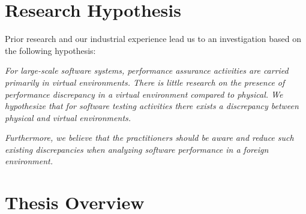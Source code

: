 
\section{Research Hypothesis}
Prior research and our industrial experience lead us to an investigation based on the following hypothesis:
	
\begin{framed}
		\textit{For large-scale software systems, performance assurance activities are carried primarily in virtual environments. There is little research on the presence of performance discrepancy in a virtual environment compared to physical. We hypothesize that for software testing activities there exists a discrepancy between physical and virtual environments.} %
		\par 	
		\textit{Furthermore, we believe that the practitioners should be aware and reduce such existing discrepancies when analyzing software performance in a foreign environment.}
\end{framed}



\section{Thesis Overview}


